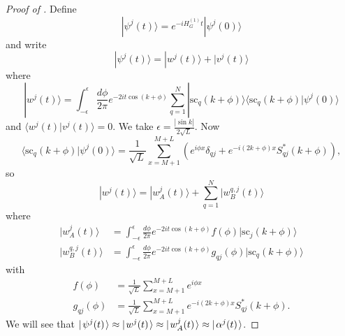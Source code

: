 \documentclass[../thesis-main/thesis-main]{subfiles}
\begin{document}
\begin{proof}[Proof of {}]
Define
\[
|\psi^{j}(t)\rangle=e^{-iH_{G}^{(1)}t}|\psi^{j}(0)\rangle
\]
and write
\[
|\psi^{j}(t)\rangle=|w^{j}(t)\rangle+|v^{j}(t)\rangle
\]
where
\[
|w^{j}(t)\rangle=\int_{-\epsilon}^{\epsilon}\frac{d\phi}{2\pi}e^{-2it\cos\left(k+\phi\right)}\sum_{q=1}^{N}|\text{sc}_{q}(k+\phi)\rangle\langle\text{sc}_{q}(k+\phi)|\psi^{j}(0)\rangle
\]
and $\langle w^{j}(t)|v^{j}(t)\rangle=0$. We take $\epsilon=\frac{\left|\sin k\right|}{2\sqrt{L}}$.
Now \[
\langle\text{sc}_{q}(k+\phi)|\psi^{j}(0)\rangle=\frac{1}{\sqrt{L}}\sum_{x=M+1}^{M+L}\left(e^{i\phi x}\delta_{qj}+e^{-i\left(2k+\phi\right)x}S_{qj}^{\ast}(k+\phi)\right),\]
 so \[
|w^{j}(t)\rangle=|w_{A}^{j}(t)\rangle+\sum_{q=1}^{N}|w_{B}^{q,j}(t)\rangle\]
 where \begin{align*}
|w_{A}^{j}(t)\rangle & = \int_{-\epsilon}^{\epsilon}\frac{d\phi}{2\pi}e^{-2it\cos\left(k+\phi\right)}f(\phi)|\text{sc}_{j}(k+\phi)\rangle\\
|w_{B}^{q,j}(t)\rangle & = \int_{-\epsilon}^{\epsilon}\frac{d\phi}{2\pi}e^{-2it\cos\left(k+\phi\right)}g_{qj}(\phi)|\text{sc}_{q}(k+\phi)\rangle
\end{align*}
with
\begin{align*}
f(\phi) & = \frac{1}{\sqrt{L}}\sum_{x=M+1}^{M+L}e^{i\phi x}\\
g_{qj}(\phi) & = \frac{1}{\sqrt{L}}\sum_{x=M+1}^{M+L}e^{-i\left(2k+\phi\right)x}S_{qj}^{\ast}(k+\phi).\end{align*}
We will see that $|\mspace{2mu} \psi^j(t) \mspace{2mu} \rangle \approx |\mspace{2mu} w^j(t) \mspace{2mu} \rangle \approx |\mspace{2mu} w^j_A(t) \mspace{2mu} \rangle \approx |\mspace{2mu} \alpha^j(t) \mspace{2mu} \rangle$.


\end{proof}
\end{document}
